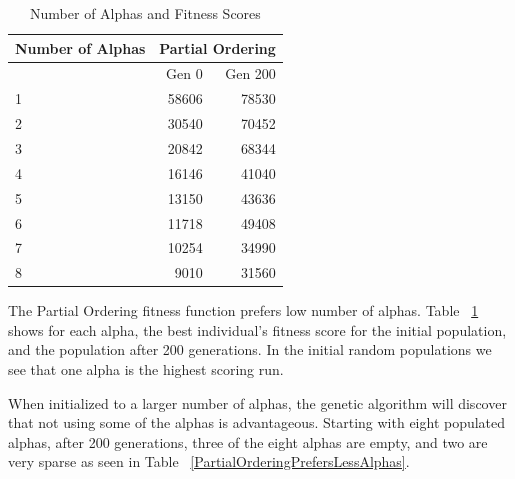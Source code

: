 \documentclass[preprint,12pt,3p]{elsarticle}
\begin{document}
\begin{table}[h]
\caption{Number of Alphas and Fitness Scores}
\label{NumberOfAlphas}
\centering
\begin{tabular}{|l|r|r|}
\hline
Number of Alphas & \multicolumn{2}{c|}{Partial Ordering} \\ \hline
                 & Gen 0            & Gen 200            \\ \hline
{ 1 } & { 58606 } & { 78530 } \\ \hline
{ 2 } & { 30540 } & { 70452 } \\ \hline
{ 3 } & { 20842 } & { 68344 } \\ \hline
{ 4 } & { 16146 } & { 41040 } \\ \hline
{ 5 } & { 13150 } & { 43636 } \\ \hline
{ 6 } & { 11718 } & { 49408 } \\ \hline
{ 7 } & { 10254 } & { 34990 } \\ \hline
{ 8 } & {  9010 } & { 31560 } \\ \hline
\end{tabular}
\end{table}

The Partial Ordering fitness function prefers low number of alphas. Table ~\ref{NumberOfAlphas} shows for each alpha, the best individual's fitness score for the initial population, and the population after 200 generations. In the initial random populations we see that one alpha is the highest scoring run.

When initialized to a larger number of alphas, the genetic algorithm will discover that not using some of the alphas is advantageous. Starting with eight populated alphas, after 200 generations, three of the eight alphas are empty, and two are very sparse as seen in Table ~\ref{PartialOrderingPrefersLessAlphas}.
\end{document}
